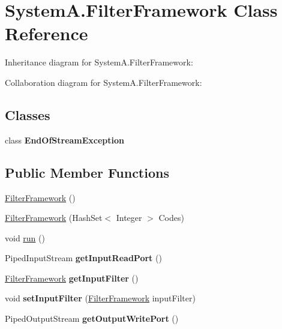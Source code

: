 \hypertarget{class_system_a_1_1_filter_framework}{}\section{System\+A.\+Filter\+Framework Class Reference}
\label{class_system_a_1_1_filter_framework}


Inheritance diagram for System\+A.\+Filter\+Framework\+:


Collaboration diagram for System\+A.\+Filter\+Framework\+:
\subsection*{Classes}
\begin{DoxyCompactItemize}
\item 
class {\bfseries End\+Of\+Stream\+Exception}
\end{DoxyCompactItemize}
\subsection*{Public Member Functions}
\begin{DoxyCompactItemize}
\item 
\hyperlink{class_system_a_1_1_filter_framework_ad7ebd0cd900fb578711b6b84079dc80a}{Filter\+Framework} ()
\item 
\hyperlink{class_system_a_1_1_filter_framework_a640d5b39042aa0a66acc3261b03b0434}{Filter\+Framework} (Hash\+Set$<$ Integer $>$ Codes)
\item 
void \hyperlink{class_system_a_1_1_filter_framework_a00efe5c6b5044acdf17db71c297d062e}{run} ()
\item 
\hypertarget{class_system_a_1_1_filter_framework_af98ac10ab07bb2e0e6668590803fc72b}{}Piped\+Input\+Stream {\bfseries get\+Input\+Read\+Port} ()\label{class_system_a_1_1_filter_framework_af98ac10ab07bb2e0e6668590803fc72b}

\item 
\hypertarget{class_system_a_1_1_filter_framework_aae378e5c79852b768d6bd96bd9d0b36e}{}\hyperlink{class_system_a_1_1_filter_framework}{Filter\+Framework} {\bfseries get\+Input\+Filter} ()\label{class_system_a_1_1_filter_framework_aae378e5c79852b768d6bd96bd9d0b36e}

\item 
\hypertarget{class_system_a_1_1_filter_framework_a48f93e54ac19d8208cb42a59e4259b0d}{}void {\bfseries set\+Input\+Filter} (\hyperlink{class_system_a_1_1_filter_framework}{Filter\+Framework} input\+Filter)\label{class_system_a_1_1_filter_framework_a48f93e54ac19d8208cb42a59e4259b0d}

\item 
\hypertarget{class_system_a_1_1_filter_framework_a53f809bc98980394826252ac762cd9e0}{}Piped\+Output\+Stream {\bfseries get\+Output\+Write\+Port} ()\label{class_system_a_1_1_filter_framework_a53f809bc98980394826252ac762cd9e0}

\end{DoxyCompactItemize}
